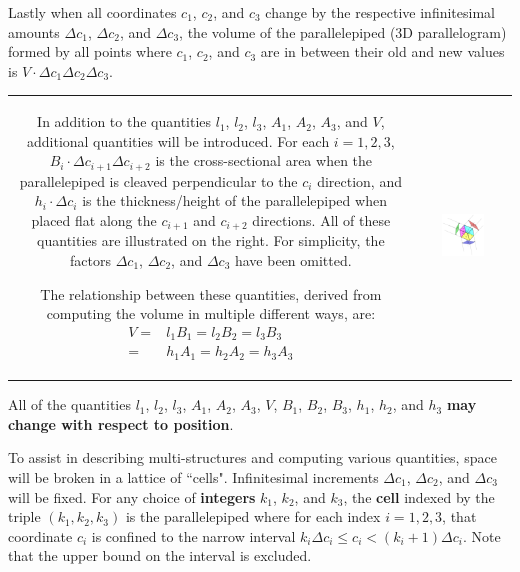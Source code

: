 \documentclass{book}
\begin{document}
Lastly when all coordinates \(c_1\), \(c_2\), and \(c_3\) change by the respective infinitesimal amounts \(\Delta c_1\), \(\Delta c_2\), and \(\Delta c_3\), the volume of the parallelepiped (3D parallelogram) formed by all points where \(c_1\), \(c_2\), and \(c_3\) are in between their old and new values is \(V \cdot \Delta c_1 \Delta c_2 \Delta c_3\). 

\begin{tabular}{cc}
\parbox{0.5\textwidth}{
In addition to the quantities \(l_1\), \(l_2\), \(l_3\), \(A_1\), \(A_2\), \(A_3\), and \(V\), additional quantities will be introduced. For each \(i = 1, 2, 3\), \(B_i \cdot \Delta c_{i+1} \Delta c_{i+2}\) is the cross-sectional area when the parallelepiped is cleaved perpendicular to the \(c_i\) direction, and \(h_i \cdot \Delta c_i\) is the thickness/height of the parallelepiped when placed flat along the \(c_{i+1}\) and \(c_{i+2}\) directions. All of these quantities are illustrated on the right. For simplicity, the factors \(\Delta c_1\), \(\Delta c_2\), and \(\Delta c_3\) have been omitted.  

The relationship between these quantities, derived from computing the volume in multiple different ways, are:
\begin{align*}
V = & l_1 B_1 = l_2 B_2 = l_3 B_3 \\ 
= & h_1 A_1 = h_2 A_2 = h_3 A_3
\end{align*} 
} & \parbox{0.5\textwidth}{
\includegraphics[width = 0.5\textwidth]{Coordinate_systems/coordinate_system}
}
\end{tabular}

All of the quantities \(l_1\), \(l_2\), \(l_3\), \(A_1\), \(A_2\), \(A_3\), \(V\), \(B_1\), \(B_2\), \(B_3\), \(h_1\), \(h_2\), and \(h_3\) {\bf may change with respect to position}.

To assist in describing multi-structures and computing various quantities, space will be broken in a lattice of ``cells". Infinitesimal increments \(\Delta c_1\), \(\Delta c_2\), and \(\Delta c_3\) will be fixed. For any choice of {\bf integers} \(k_1\), \(k_2\), and \(k_3\), the {\bf cell} indexed by the triple \((k_1, k_2, k_3)\) is the parallelepiped where for each index \(i = 1, 2, 3\), that coordinate \(c_i\) is confined to the narrow interval \(k_i \Delta c_i \leq c_i < (k_i + 1)\Delta c_i\). Note that the upper bound on the interval is excluded. 
\end{document}
